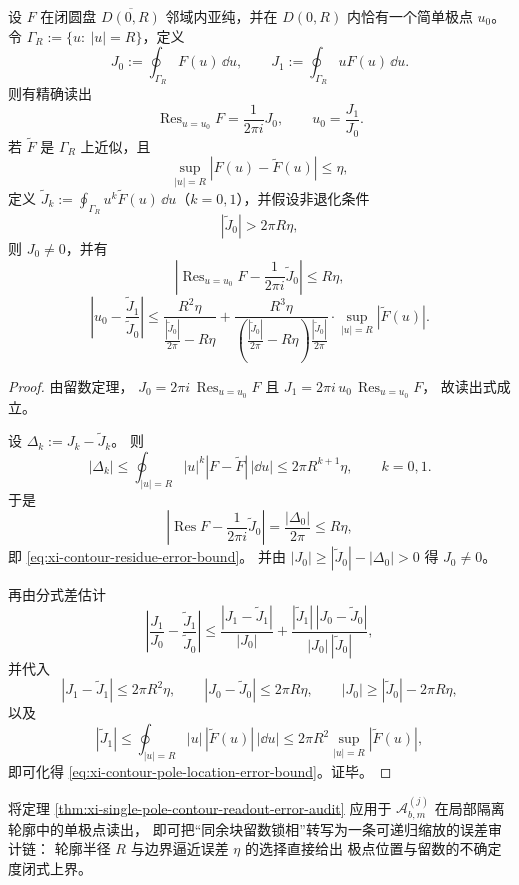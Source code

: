 \begin{theorem}[单极点轮廓积分读出与可审计误差界]\label{thm:xi-single-pole-contour-readout-error-audit}
设 \(F\) 在闭圆盘 \(\overline{D(0,R)}\) 邻域内亚纯，并在 \(D(0,R)\) 内恰有一个简单极点 \(u_0\)。
令 \(\Gamma_R:=\{u:\ |u|=R\}\)，定义
\[
J_0:=\oint_{\Gamma_R}F(u)\,\dd u,\qquad
J_1:=\oint_{\Gamma_R}uF(u)\,\dd u.
\]
则有精确读出
\[
\operatorname{Res}_{u=u_0}F=\frac{1}{2\pi i}J_0,\qquad
u_0=\frac{J_1}{J_0}.
\]
若 \(\widetilde F\) 是 \(\Gamma_R\) 上近似，且
\[
\sup_{|u|=R}|F(u)-\widetilde F(u)|\le \eta,
\]
定义 \(\widetilde J_k:=\oint_{\Gamma_R}u^k\widetilde F(u)\,\dd u\)（\(k=0,1\)），并假设非退化条件
\[
|\widetilde J_0|>2\pi R\eta,
\]
则 \(J_0\neq 0\)，并有
\begin{equation}\label{eq:xi-contour-residue-error-bound}
\left|\operatorname{Res}_{u=u_0}F-\frac{1}{2\pi i}\widetilde J_0\right|
\le R\eta,
\end{equation}
\begin{equation}\label{eq:xi-contour-pole-location-error-bound}
\left|u_0-\frac{\widetilde J_1}{\widetilde J_0}\right|
\le
\frac{R^2\eta}{\frac{|\widetilde J_0|}{2\pi}-R\eta}
+
\frac{R^3\eta}{\left(\frac{|\widetilde J_0|}{2\pi}-R\eta\right)\frac{|\widetilde J_0|}{2\pi}}
\cdot
\sup_{|u|=R}|\widetilde F(u)|.
\end{equation}
\end{theorem}

\begin{proof}
由留数定理，
\(
J_0=2\pi i\,\operatorname{Res}_{u=u_0}F
\)
且
\(
J_1=2\pi i\,u_0\,\operatorname{Res}_{u=u_0}F
\)，
故读出式成立。

设 \(\Delta_k:=J_k-\widetilde J_k\)。
则
\[
|\Delta_k|
\le
\oint_{|u|=R}|u|^k|F-\widetilde F|\,|\dd u|
\le
2\pi R^{k+1}\eta,
\qquad k=0,1.
\]
于是
\[
\left|\operatorname{Res}F-\frac{1}{2\pi i}\widetilde J_0\right|
=\frac{|\Delta_0|}{2\pi}\le R\eta,
\]
即 \eqref{eq:xi-contour-residue-error-bound}。
并由 \(|J_0|\ge |\widetilde J_0|-|\Delta_0|>0\) 得 \(J_0\neq 0\)。

再由分式差估计
\[
\left|\frac{J_1}{J_0}-\frac{\widetilde J_1}{\widetilde J_0}\right|
\le
\frac{|J_1-\widetilde J_1|}{|J_0|}
+
\frac{|\widetilde J_1|\,|J_0-\widetilde J_0|}{|J_0|\,|\widetilde J_0|},
\]
并代入
\[
|J_1-\widetilde J_1|\le 2\pi R^2\eta,\qquad
|J_0-\widetilde J_0|\le 2\pi R\eta,\qquad
|J_0|\ge |\widetilde J_0|-2\pi R\eta,
\]
以及
\[
|\widetilde J_1|
\le
\oint_{|u|=R}|u|\,|\widetilde F(u)|\,|\dd u|
\le
2\pi R^2\sup_{|u|=R}|\widetilde F(u)|,
\]
即可化得 \eqref{eq:xi-contour-pole-location-error-bound}。证毕。
\end{proof}

\begin{remark}[与同余块极点审计的接口]\label{rem:xi-congruence-block-contour-audit-interface}
将定理 \ref{thm:xi-single-pole-contour-readout-error-audit}
应用于 \(\mathcal A_{b,m}^{(j)}\) 在局部隔离轮廓中的单极点读出，
即可把“同余块留数锁相”转写为一条可递归缩放的误差审计链：
轮廓半径 \(R\) 与边界逼近误差 \(\eta\) 的选择直接给出
极点位置与留数的不确定度闭式上界。
\end{remark}

\endinput
